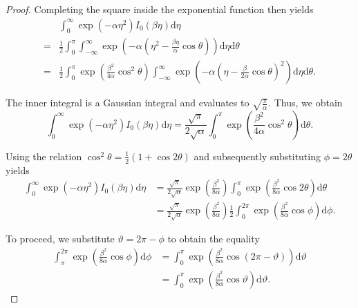\documentclass[a4paper,12pt]{article}
\theoremstyle{plain}
\theoremstyle{definition}
\numberwithin{equation}{section}
\begin{document}
\begin{appendix}
\begin{proof}
		Completing the square inside the exponential function then yields
		\begin{align*}
			&\int_0^\infty \exp \left( - \alpha \eta^2 \right) I_0 ( \beta \eta ) \mathrm{d}\eta \\
			=& \frac{1}{2} \int_0^\pi \int_{-\infty}^\infty \exp \left( - \alpha \left( \eta^2 - \frac{\beta \eta}{\alpha} \cos \theta \right) \right) \mathrm{d}\eta \mathrm{d}\theta \\
			=& \frac{1}{2} \int_0^\pi \exp \left( \frac{\beta^2}{4 \alpha} \cos^2 \theta \right) \int_{-\infty}^\infty \exp \left( - \alpha \left( \eta - \frac{\beta}{2 \alpha} \cos \theta \right)^2 \right) \mathrm{d}\eta \mathrm{d}\theta.
		\end{align*}
		
		The inner integral is a Gaussian integral and evaluates to $\sqrt{\frac{\pi}{\alpha}}$. Thus, we obtain
		\begin{equation*}
			\int_0^\infty \exp \left( - \alpha \eta^2 \right) I_0 ( \beta \eta ) \mathrm{d}\eta = \frac{\sqrt{\pi}}{2 \sqrt{\alpha}} \int_0^\pi \exp \left( \frac{\beta^2}{4 \alpha} \cos^2 \theta \right) \mathrm{d}\theta.
		\end{equation*}
		
		Using the relation $\cos^2 \theta = \frac{1}{2} \left( 1 + \cos 2 \theta \right)$ and subsequently substituting $\phi = 2 \theta$ yields
		\begin{align*}
			\int_0^\infty \exp \left( - \alpha \eta^2 \right) I_0 ( \beta \eta ) \mathrm{d}\eta &= \frac{\sqrt{\pi}}{2 \sqrt{\alpha}} \exp \left( \frac{\beta^2}{8 \alpha} \right) \int_0^\pi \exp \left( \frac{\beta^2}{8 \alpha} \cos 2 \theta \right) \mathrm{d}\theta \\
			&= \frac{\sqrt{\pi}}{2 \sqrt{\alpha}} \exp \left( \frac{\beta^2}{8 \alpha} \right) \frac{1}{2} \int_0^{2 \pi} \exp \left( \frac{\beta^2}{8 \alpha} \cos \phi \right) \mathrm{d}\phi.
		\end{align*}
		
		To proceed, we substitute $\vartheta = 2 \pi - \phi$ to obtain the equality
		\begin{align*}
			\int_\pi^{2 \pi} \exp \left( \frac{\beta^2}{8 \alpha} \cos \phi \right) \mathrm{d}\phi &= \int_0^\pi \exp \left( \frac{\beta^2}{8 \alpha} \cos \left( 2 \pi - \vartheta \right) \right) \mathrm{d}\vartheta \\
			&= \int_0^\pi \exp \left( \frac{\beta^2}{8 \alpha} \cos \vartheta \right) \mathrm{d}\vartheta.
		\end{align*}
		

\end{proof}
\end{appendix}
\end{document}
